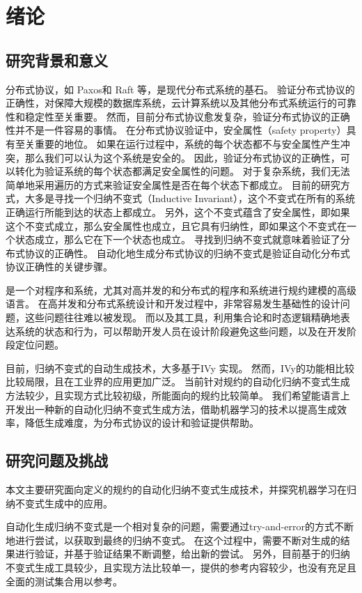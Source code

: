 \chapter{绪论}\label{chap:introduction}

\section{研究背景和意义}
分布式协议，如 Paxos\cite{paxos}和 Raft\cite{raft} 等，是现代分布式系统的基石。
验证分布式协议的正确性，对保障大规模的数据库系统，云计算系统以及其他分布式系统运行的可靠性和稳定性至关重要。
然而，目前分布式协议愈发复杂，验证分布式协议的正确性并不是一件容易的事情。
在分布式协议验证中，安全属性（safety property）\cite{safety}具有至关重要的地位。
如果在运行过程中，系统的每个状态都不与安全属性产生冲突，那么我们可以认为这个系统是安全的。
因此，验证分布式协议的正确性，可以转化为验证系统的每个状态都满足安全属性的问题。
对于复杂系统，我们无法简单地采用遍历的方式来验证安全属性是否在每个状态下都成立。
目前的研究方式，大多是寻找一个归纳不变式（Inductive Invariant）\cite{inductive}，这个不变式在所有的系统正确运行所能到达的状态上都成立。
另外，这个不变式蕴含了安全属性，即如果这个不变式成立，那么安全属性也成立，且它具有归纳性，即如果这个不变式在一个状态成立，那么它在下一个状态也成立。
寻找到归纳不变式就意味着验证了分布式协议的正确性。\cite{towards}
自动化地生成分布式协议的归纳不变式是验证自动化分布式协议正确性的关键步骤。

\TLA \cite{TLA+}是一个对程序和系统，尤其对高并发的和分布式的程序和系统进行规约建模的高级语言。
在高并发和分布式系统设计和开发过程中，非常容易发生基础性的设计问题，这些问题往往难以被发现。
而\TLA 以及其工具，利用集合论和时态逻辑精确地表达系统的状态和行为，可以帮助开发人员在设计阶段避免这些问题，以及在开发阶段定位问题。

目前，归纳不变式的自动生成技术，大多基于IVy \cite{Ivy} 实现。
然而，IVy的功能相比较\TLA 比较局限，且\TLA 在工业界的应用更加广泛。
当前针对\TLA 规约的自动化归纳不变式生成方法较少，且实现方式比较初级，所能面向的规约比较简单。
我们希望能\TLA 语言上开发出一种新的自动化归纳不变式生成方法，借助机器学习的技术以提高生成效率，降低生成难度，为分布式协议的设计和验证提供帮助。

\section{研究问题及挑战}
本文主要研究面向\TLA 定义的规约的自动化归纳不变式生成技术，并探究机器学习在归纳不变式生成中的应用。

自动化生成归纳不变式是一个相对复杂的问题，需要通过try-and-error的方式不断地进行尝试，以获取到最终的归纳不变式。
在这个过程中，需要不断对生成的结果进行验证，并基于验证结果不断调整，给出新的尝试。
另外，目前基于\TLA 的归纳不变式生成工具较少，且实现方法比较单一，提供的参考内容较少，也没有充足且全面的测试集合用以参考。

